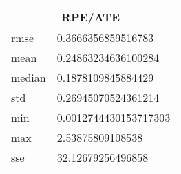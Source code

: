 \begin{table}[!ht] 
 \centering 
 \begin{tabular}{|l|l|} \hline 
 \multicolumn{2}{|c|}{RPE/ATE} \\ \hline 
 rmse & 0.3666356859516783 \\ \hline 
mean & 0.24863234636100284 \\ \hline 
median & 0.1878109845884429 \\ \hline 
std & 0.26945070524361214 \\ \hline 
min & 0.0012744430153717303 \\ \hline 
max & 2.53875809108538 \\ \hline 
sse & 32.12679256496858 \\ \hline 
\end{tabular} 
 \end{table}